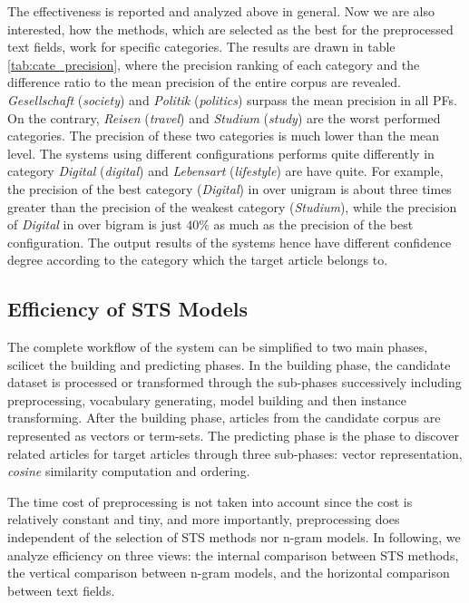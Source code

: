The effectiveness is reported and analyzed above in general. Now we are also interested, how the methods, which are selected as the best for the preprocessed text fields, work for specific categories. The results are drawn in table \ref{tab:cate_precision}, where the precision ranking of each category and the difference ratio to the mean precision of the entire corpus are revealed. \textit{Gesellschaft} (\textit{society}) and \textit{Politik} (\textit{politics}) surpass the mean precision in all PFs. On the contrary, \textit{Reisen} (\textit{travel}) and \textit{Studium} (\textit{study}) are the worst performed categories. The precision of these two categories is much lower than the mean level. The systems using different configurations performs quite differently in category \textit{Digital} (\textit{digital}) and \textit{Lebensart} (\textit{lifestyle}) are have quite. For example, the precision of the best category (\textit{Digital}) in \icontent{} over unigram is about three times greater than the precision of the weakest category (\textit{Studium}), while the precision of \textit{Digital} in \isummary{} over bigram is just $40\%$ as much as the precision of the best configuration. The output results of the systems hence have different confidence degree according to the category which the target article belongs to. 

\subsection{Efficiency of STS Models}
\label{sec:5.3}

The complete workflow of the system can be simplified to two main phases, scilicet the building and predicting phases. In the building phase, the candidate dataset is processed or transformed through the sub-phases successively including preprocessing, vocabulary generating, model building and then instance transforming. After the building phase, articles from the candidate corpus are represented as vectors or term-sets. The predicting phase is the phase to discover related articles for target articles through three sub-phases: vector representation, \textit{cosine} similarity computation and ordering. 

The time cost of preprocessing is not taken into account since the cost is relatively constant and tiny, and more importantly, preprocessing does independent of the selection of STS methods nor n-gram models. In following, we analyze efficiency on three views: the internal comparison between STS methods, the vertical comparison between n-gram models, and the  horizontal comparison between text fields. 

